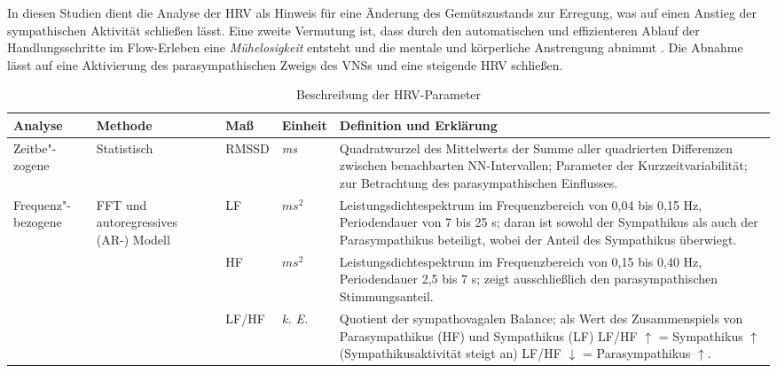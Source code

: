 In diesen Studien dient die Analyse der \ac{HRV} als Hinweis für eine Änderung des Gemütszustands zur Erregung, was auf einen Anstieg der sympathischen Aktivität schließen lässt. Eine zweite Vermutung ist, dass durch den automatischen und effizienteren Ablauf der Handlungsschritte im Flow-Erleben eine \emph{Mühelosigkeit} entsteht und die mentale und körperliche Anstrengung abnimmt \citep[][S.~308]{deManzano2010}. Die Abnahme lässt auf eine Aktivierung des parasympathischen Zweigs des \ac{VNS}s und eine steigende \ac{HRV} schließen. 
\begin{table}
	[!htb] \caption[Beschreibung der \acs{HRV}-Parameter]{Beschreibung der \acs{HRV}-Parameter} \label{tab:beschreibung_der_hrv_parameter} 
	\begin{tabularx}
		{ 
		\textwidth}{p{} p{} p{} p{} X} \toprule Analyse & Methode & Maß & Einheit & Definition und Erklärung \\
		\midrule Zeitbe"-zogene & Statistisch & \acs{RMSSD} & \emph{ms} & Quadratwurzel des Mittelwerts der Summe aller quadrierten Differenzen zwischen benachbarten NN-Intervallen; Parameter der Kurzzeitvariabilität; zur Betrachtung des parasympathischen Einflusses. \\
		\hline
		
		Frequenz"-bezogene & \acs{FFT} und autoregressives (AR-) Modell & \acs{LF} & $ms^{2}$ & Leistungsdichtespektrum im Frequenzbereich von 0,04 bis 0,15 Hz, Periodendauer von 7 bis 25 s; daran ist sowohl der Sympathikus als auch der Parasympathikus beteiligt, wobei der Anteil des Sympathikus überwiegt. \\
		\cline{3-5}
		
		& & \acs{HF} & $ms^{2}$ & Leistungsdichtespektrum im Frequenzbereich von 0,15 bis 0,40 Hz, Periodendauer 2,5 bis 7 s; zeigt ausschließlich den parasympathischen Stimmungsanteil. \\
		\cline{3-5}
		
		& & \acs{LF}/\acs{HF} & \emph{k. E.} & Quotient der sympathovagalen Balance; als Wert des Zusammenspiels von Parasympathikus (\acs{HF}) und Sympathikus (\acs{LF}) \acs{LF}/\acs{HF} $\uparrow{}$ = Sympathikus $\uparrow{}$ (Sympathikusaktivität steigt an) \acs{LF}/\acs{HF} $\downarrow{}$ = Parasympathikus $\uparrow{}$. \\
		\bottomrule 
	\end{tabularx}
\end{table}

\paragraph{\citet{deManzano2010}} 

